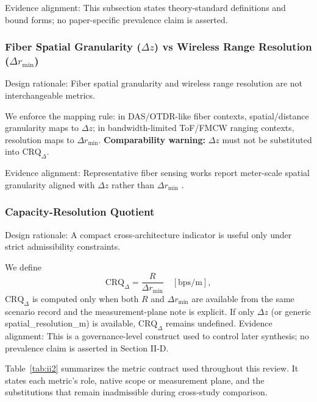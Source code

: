 \documentclass[letterpaper,journal]{IEEEtran}
\begin{document}
Evidence alignment: This subsection states theory-standard definitions and bound forms; no paper-specific prevalence claim is asserted.

\subsubsection{Fiber Spatial Granularity (\(\Delta z\)) vs Wireless Range Resolution (\(\Delta r_{\min}\))}
Design rationale: Fiber spatial granularity and wireless range resolution are not interchangeable metrics.

We enforce the mapping rule: in DAS/OTDR-like fiber contexts, spatial/distance granularity maps to \(\Delta z\); in bandwidth-limited ToF/FMCW ranging contexts, resolution maps to \(\Delta r_{\min}\). \textbf{Comparability warning:} \(\Delta z\) must not be substituted into \(\mathrm{CRQ}_{\Delta}\).

Evidence alignment: Representative fiber sensing works report meter-scale spatial granularity aligned with \(\Delta z\) rather than \(\Delta r_{\min}\) \cite{O_ISAC_006,O_ISAC_013}.

\subsubsection{Capacity-Resolution Quotient}
Design rationale: A compact cross-architecture indicator is useful only under strict admissibility constraints.

We define
\begin{equation}
    \mathrm{CRQ}_{\Delta} = \frac{R}{\Delta r_{\min}} \quad [\mathrm{bps/m}],
\end{equation}
\(\mathrm{CRQ}_{\Delta}\) is computed only when both \(R\) and \(\Delta r_{\min}\) are available from the same scenario record and the measurement-plane note is explicit. If only \(\Delta z\) (or generic spatial\_resolution\_m) is available, \(\mathrm{CRQ}_{\Delta}\) remains undefined.
Evidence alignment: This is a governance-level construct used to control later synthesis; no prevalence claim is asserted in Section II-D.

Table~\ref{tab:ii2} summarizes the metric contract used throughout this review. It states each metric's role, native scope or measurement plane, and the substitutions that remain inadmissible during cross-study comparison.
\end{document}
